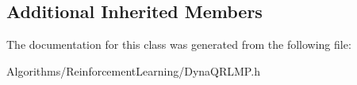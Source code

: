 \subsection*{Additional Inherited Members}


The documentation for this class was generated from the following file\-:\begin{DoxyCompactItemize}
\item 
Algorithms/\-Reinforcement\-Learning/Dyna\-Q\-R\-L\-M\-P.\-h\end{DoxyCompactItemize}
